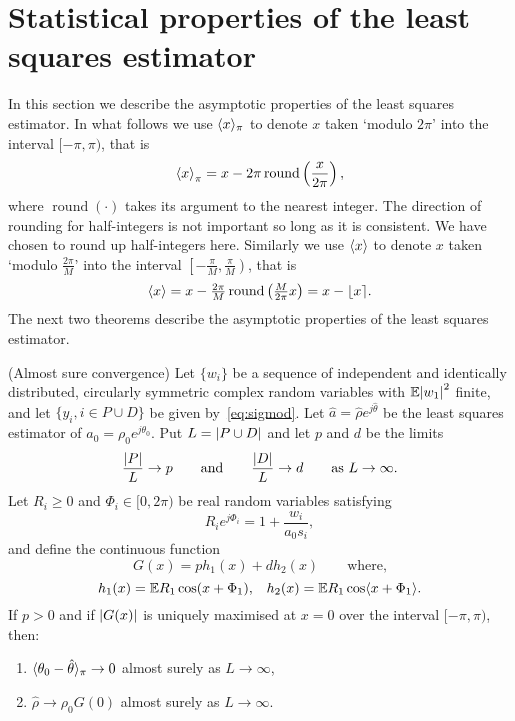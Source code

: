 \documentclass[journal]{IEEEtran}
\begin{document}
\section{Statistical properties of the least squares estimator}\label{sec:stat-prop-least}

In this section we describe the asymptotic properties of the least squares estimator.  In what follows we use $\langle x \rangle_\pi$ to denote $x$ taken `modulo $2\pi$' into the interval $[-\pi, \pi)$, that is
\[
\left\langle x \right\rangle_\pi = x - 2\pi\operatorname{round}\left(\frac{x}{2\pi}\right),
\]
where $\operatorname{round}(\cdot)$ takes its argument to the nearest integer.  The direction of rounding for half-integers is not important so long as it is consistent.  We have chosen to round up half-integers here.  Similarly we use $\langle x \rangle$ to denote $x$ taken `modulo $\tfrac{2\pi}{M}$' into the interval $\left[-\tfrac{\pi}{M}, \tfrac{\pi}{M}\right)$, that is
\[
\left\langle x \right\rangle = x - \tfrac{2\pi}{M}\operatorname{round}\left(\tfrac{M}{2\pi}x\right) = x - {\left\lfloor x \right\rceil}.
\]
The next two theorems describe the asymptotic properties of the least squares estimator.

\begin{theorem}\label{thm:consistency} (Almost sure convergence)
Let $\{w_i\}$ be a sequence of independent and identically distributed, circularly symmetric complex random variables with ${\mathbb E} {\left\vert w_1 \right\vert}^2$ finite, and let $\{y_i, i \in P \cup D\}$ be given by~\eqref{eq:sigmod}.   Let $\hat{a} = \hat{\rho}e^{j\hat{\theta}}$ be the least squares estimator of $a_0 = \rho_0e^{j\theta_0}$. %
Put $L = {\left\vert P \cup D \right\vert}$ and let $p$ and $d$ be the limits
\[
\frac{{\left\vert P \right\vert}}{L} \rightarrow p \qquad \text{and} \qquad \frac{{\left\vert D \right\vert}}{L} \rightarrow d \qquad \text{as $L \rightarrow \infty$.}
\] 
Let $R_i \geq 0$ and $\Phi_i \in [0,2\pi)$ be real random variables satisfying
\begin{equation}\label{eq:RiandPhii}
R_ie^{j\Phi_i} = 1 + \frac{w_i}{a_0 s_i} ,
\end{equation}
and define the continuous function
\[
G(x) = p h_1(x) + d h_2(x) \qquad \text{where,}
\]
\[
h_1(x) = {\mathbb E} R_1 \cos(x + \Phi_1), \;\;\; h_2(x) =  {\mathbb E} R_1 \cos\langle  x + \Phi_1 \rangle.
\]
If $p > 0$ and if ${\left\vert G(x) \right\vert}$ is uniquely maximised at $x = 0$ over the interval $[-\pi,\pi)$, then:
\begin{enumerate}
\item $\langle \theta_0 - \hat{\theta} \rangle_\pi \rightarrow 0$ almost surely as $L \rightarrow \infty$,
\item $\hat{\rho} \rightarrow \rho_0 G(0)$ almost surely as $L \rightarrow \infty$.
\end{enumerate}
\end{theorem}
\end{document}
